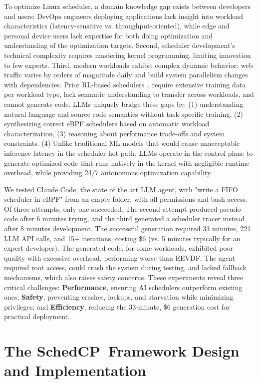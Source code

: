 \documentclass[preprint]{article}
\newcommand{\sys}{SchedCP\xspace}
\begin{document}
To optimize Linux scheduler, a domain knowledge gap exists between developers and users: DevOps engineers deploying applications lack insight into workload characteristics (latency-sensitive vs. throughput-oriented), while edge and personal device users lack expertise for both doing optimization and understanding of the optimization targets. Second, scheduler development's technical complexity requires mastering kernel programming, limiting innovation to few experts. Third, modern workloads exhibit complex dynamic behavior: web traffic varies by orders of magnitude daily and build system parallelism changes with dependencies. Prior RL-based schedulers~\cite{mao2019decima,qiu2020firm,zhang2024mrsch,mao2019park}, require extensive training data per workload type, lack semantic understanding to transfer across workloads, and cannot generate code. LLMs uniquely bridge these gaps by: (1) understanding natural language and source code semantics without task-specific training, (2) synthesizing correct eBPF schedulers based on automatic workload characterization, (3) reasoning about performance trade-offs and system constraints. (4) Unlike traditional ML models that would cause unacceptable inference latency in the scheduler hot path, LLMs operate in the control plane to generate optimized code that runs natively in the kernel with negligible runtime overhead, while providing 24/7 autonomous optimization capability.


We tested Claude Code\cite{claudecode}, the state of the art LLM agent, with "write a FIFO scheduler in eBPF" from an empty folder, with all permissions and bash access. Of three attempts, only one succeeded. The second attempt produced pseudo-code after 6 minutes trying, and the third generated a scheduler tracer instead after 8 minutes development. The successful generation required 33 minutes, 221 LLM API calls, and 15+ iterations, costing \$6 (vs. 5 minutes typically for an expert developer). The generated code, for some workloads, exhibited poor quality with excessive overhead, performing worse than EEVDF. The agent required root access, could crash the system during testing, and lacked fallback mechanisms, which also raises safety concerns. These experiments reveal three critical challenges: \textbf{Performance}, ensuring AI schedulers outperform existing ones; \textbf{Safety}, preventing crashes, lockups, and starvation while minimizing privileges; and \textbf{Efficiency}, reducing the 33-minute, \$6 generation cost for practical deployment.

\section{The \sys\ Framework Design and Implementation}
\label{sec:schedcp_framework}
\end{document}
